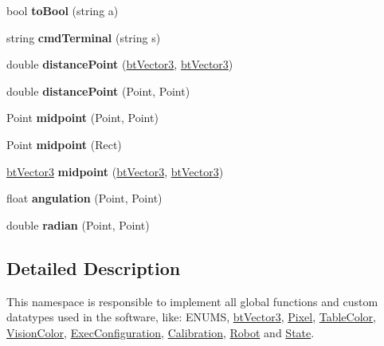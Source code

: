 \begin{DoxyCompactItemize}
\item 
\hypertarget{namespacecommon_aed690e352783334b551a1c74947cb101}{bool {\bfseries to\-Bool} (string a)}\label{namespacecommon_aed690e352783334b551a1c74947cb101}

\item 
\hypertarget{namespacecommon_a5899229353a9bcf1570191eb9acea137}{string {\bfseries cmd\-Terminal} (string s)}\label{namespacecommon_a5899229353a9bcf1570191eb9acea137}

\item 
\hypertarget{namespacecommon_ac8769b01d13707ef6598888005e643e9}{double {\bfseries distance\-Point} (\hyperlink{structcommon_1_1btVector3}{bt\-Vector3}, \hyperlink{structcommon_1_1btVector3}{bt\-Vector3})}\label{namespacecommon_ac8769b01d13707ef6598888005e643e9}

\item 
\hypertarget{namespacecommon_a0319cc29ee430ecb0ca77d0f95cdc309}{double {\bfseries distance\-Point} (Point, Point)}\label{namespacecommon_a0319cc29ee430ecb0ca77d0f95cdc309}

\item 
\hypertarget{namespacecommon_a2968370f29c08892258794b87bac33fb}{Point {\bfseries midpoint} (Point, Point)}\label{namespacecommon_a2968370f29c08892258794b87bac33fb}

\item 
\hypertarget{namespacecommon_a820e29c932b1f0b6a865772239beeb57}{Point {\bfseries midpoint} (Rect)}\label{namespacecommon_a820e29c932b1f0b6a865772239beeb57}

\item 
\hypertarget{namespacecommon_a8018da38b6ea9b1dfa514730ad24ab2b}{\hyperlink{structcommon_1_1btVector3}{bt\-Vector3} {\bfseries midpoint} (\hyperlink{structcommon_1_1btVector3}{bt\-Vector3}, \hyperlink{structcommon_1_1btVector3}{bt\-Vector3})}\label{namespacecommon_a8018da38b6ea9b1dfa514730ad24ab2b}

\item 
\hypertarget{namespacecommon_a8c1ef8d4ce3fdb3e30af47c9c11bf04a}{float {\bfseries angulation} (Point, Point)}\label{namespacecommon_a8c1ef8d4ce3fdb3e30af47c9c11bf04a}

\item 
\hypertarget{namespacecommon_ac58a1918510dc4dbc7b65255593df38e}{double {\bfseries radian} (Point, Point)}\label{namespacecommon_ac58a1918510dc4dbc7b65255593df38e}

\end{DoxyCompactItemize}


\subsection{Detailed Description}
This namespace is responsible to implement all global functions and custom datatypes used in the software, like\-: E\-N\-U\-M\-S, \hyperlink{structcommon_1_1btVector3}{bt\-Vector3}, \hyperlink{structcommon_1_1Pixel}{Pixel}, \hyperlink{structcommon_1_1TableColor}{Table\-Color}, \hyperlink{structcommon_1_1VisionColor}{Vision\-Color}, \hyperlink{structcommon_1_1ExecConfiguration}{Exec\-Configuration}, \hyperlink{structcommon_1_1Calibration}{Calibration}, \hyperlink{structcommon_1_1Robot}{Robot} and \hyperlink{structcommon_1_1State}{State}. 